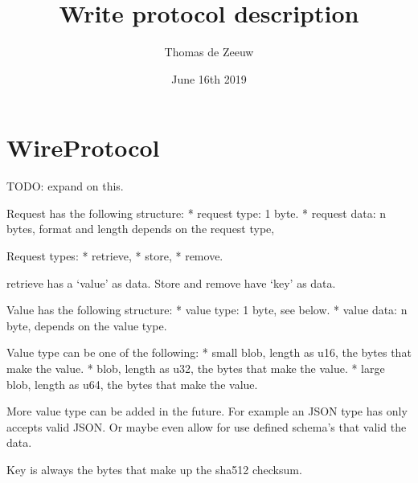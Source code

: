 \documentclass{scrartcl}
\title{Write protocol description}
\author{Thomas de Zeeuw}
\date{June 16th 2019}
\begin{document}
\maketitle

\section{WireProtocol} \label{sec:wire_protocol}

TODO: expand on this.

Request has the following structure:
* request type: 1 byte.
* request data: n bytes, format and length depends on the request type,

Request types:
* retrieve,
* store,
* remove.

retrieve has a `value' as data.
Store and remove have `key' as data.

Value has the following structure:
* value type: 1 byte, see below.
* value data: n byte, depends on the value type.

Value type can be one of the following:
* small blob, length as u16, the bytes that make the value.
* blob, length as u32, the bytes that make the value.
* large blob, length as u64, the bytes that make the value.

More value type can be added in the future. For example an JSON type has only
accepts valid JSON. Or maybe even allow for use defined schema's that valid the
data.

Key is always the bytes that make up the sha512 checksum.
\end{document}
